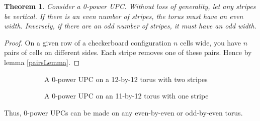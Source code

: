 \documentclass[12pt]{article}
\newtheorem{theorem}{Theorem}%
\theoremstyle{definition}
\theoremstyle{remark}
\theoremstyle{remark}
\begin{document}
\begin{theorem}
Consider a 0-power UPC. Without loss of generality, let any stripes be vertical. If there is an even number of stripes, the torus must have an even width. Inversely, if there are an odd number of stripes, it must have an odd width.
\end{theorem}
\begin{proof}
On a given row of a checkerboard configuration $n$ cells wide, you have $n$ pairs of cells on different sides. Each stripe removes one of these pairs. Hence by lemma \ref{pairsLemma}. %
\end{proof}

\begin{figure}[H]
  \centering
  \begin{subfigure}[b]{\linewidth}
    \centering
    \caption{A $0$-power UPC on a 12-by-12 torus with two stripes}
  \end{subfigure}
  \begin{subfigure}[b]{\linewidth}
    \centering
    \caption{A $0$-power UPC on an 11-by-12 torus with one stripe}  
  \end{subfigure}
  \caption{}
\end{figure}



\par
Thus, 0-power UPCs can be made on any even-by-even or odd-by-even torus.
\end{document}
